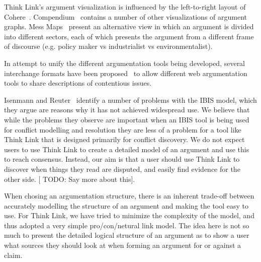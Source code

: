 \documentclass{chi2009}
\newcommand{\todo}[1]{{[\color{blue} TODO: #1]}}
\begin{document}
Think Link's argument visualization is influenced by the left-to-right layout of Cohere~\cite{Shum2008}. Compendium~\cite{Selvin2001} contains a number of other visualizations of argument graphs. Mess Maps~\cite{Horn2007} present an alternative view in which an argument is divided into different sectors, each of which presents the argument from a different frame of discourse (e.g. policy maker vs industrialist vs environmentalist).

In attempt to unify the different argumentation tools being developed, several interchange formats have been proposed~\cite{Rahwan2007a,McGinnis2007} to allow different web argumentation tools to share descriptions of contentious issues.

Isenmann and Reuter~\cite{Isenmann1997} identify a number of problems with the IBIS model, which they argue are reasons why it has not achieved widespread use. We believe that while the problems they observe are important when an IBIS tool is being used for conflict modelling and resolution they are less of a problem for a tool like Think Link that is designed primarily for conflict discovery. We do not expect users to use Think Link to create a detailed model of an argument and use this to reach consensus. Instead, our aim is that a user should use Think Link to discover when things they read are disputed, and easily find evidence for the other side.
\todo{Say more about this}.

When chosing an argumentation structure, there is an inherent trade-off between accurately modelling the structure of an argument and making the tool easy to use. For Think Link, we have tried to minimize the complexity of the model, and thus adopted a very simple pro/con/netural link model. The idea here is not so much to present the detailed logical structure of an argument as to show a user what sources they should look at when forming an argument for or against a claim.

% 
% 

% 
% 
% 
% 
% 
% 
\end{document}
